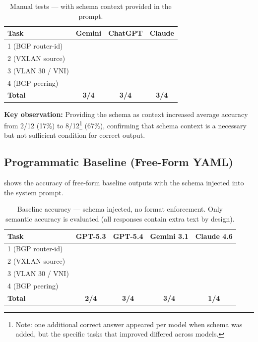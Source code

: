 \documentclass[11pt, letterpaper]{article}
\newcommand{\cmark}{\ding{51}}  %
\newcommand{\xmark}{\ding{55}}  %
\begin{document}
\begin{table}[H]
\centering
\caption{Manual tests --- with schema context provided in the prompt.}
\label{tab:manual_with_schema}
\begin{tabular}{lccc}
\toprule
\textbf{Task} & \textbf{Gemini} & \textbf{ChatGPT} & \textbf{Claude} \\
\midrule
1 (BGP router-id) & \cmark & \xmark & \cmark \\
2 (VXLAN source)   & \xmark & \cmark & \xmark \\
3 (VLAN 30 / VNI)  & \cmark & \cmark & \cmark \\
4 (BGP peering)    & \cmark & \cmark & \cmark \\
\midrule
\textbf{Total} & \textbf{3/4} & \textbf{3/4} & \textbf{3/4} \\
\bottomrule
\end{tabular}
\end{table}

\noindent\textbf{Key observation:} Providing the schema as context increased average accuracy from 2/12 (17\%) to 8/12\footnote{Note: one additional correct answer appeared per model when schema was added, but the specific tasks that improved differed across models.} (67\%), confirming that schema context is a necessary but not sufficient condition for correct output.

\subsection{Programmatic Baseline (Free-Form YAML)}
\label{sec:baseline_results}

 shows the accuracy of free-form baseline outputs with the schema injected into the system prompt.

\begin{table}[H]
\centering
\caption{Baseline accuracy --- schema injected, no format enforcement. Only semantic accuracy is evaluated (all responses contain extra text by design).}
\label{tab:baseline}
\begin{tabular}{lcccc}
\toprule
\textbf{Task} & \textbf{GPT-5.3} & \textbf{GPT-5.4} & \textbf{Gemini 3.1} & \textbf{Claude 4.6} \\
\midrule
1 (BGP router-id) & \xmark & \xmark & \cmark & \xmark \\
2 (VXLAN source)   & \xmark & \cmark & \xmark & \xmark \\
3 (VLAN 30 / VNI)  & \cmark & \cmark & \cmark & \cmark \\
4 (BGP peering)    & \cmark & \cmark & \cmark & \xmark \\
\midrule
\textbf{Total} & \textbf{2/4} & \textbf{3/4} & \textbf{3/4} & \textbf{1/4} \\
\bottomrule
\end{tabular}
\end{table}
\end{document}
